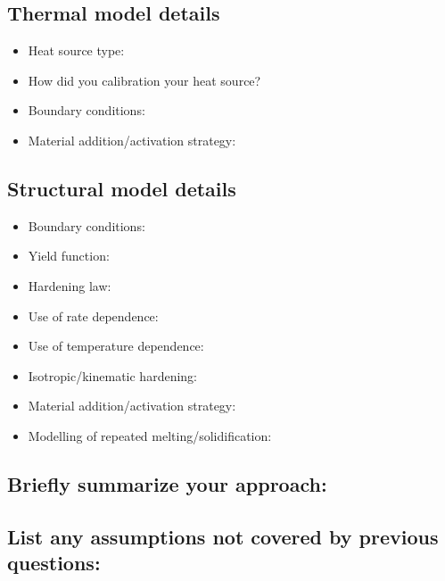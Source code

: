 \documentclass[12pt]{article}
\begin{document}
\subsection*{Thermal model details}
\begin{itemize}
    \item Heat source type:
    \item How did you calibration your heat source?
    \item Boundary conditions:
    \item Material addition/activation strategy:
\end{itemize}

\subsection*{Structural model details}
\begin{itemize}
    \item Boundary conditions:
    \item Yield function:
    \item Hardening law:
    \item Use of rate dependence:
    \item Use of temperature dependence:
    \item Isotropic/kinematic hardening:
    \item Material addition/activation strategy:
    \item Modelling of repeated melting/solidification: 
\end{itemize}

\subsection*{Briefly summarize your approach:}

\subsection*{List any assumptions not covered by previous questions:}
\end{document}
